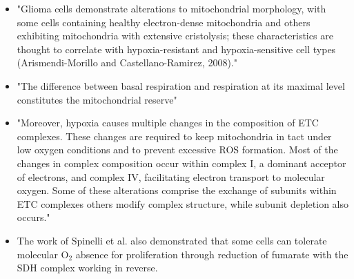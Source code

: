 \documentclass[11pt,a4paper]{article}
\begin{document}
\begin{itemize}
\item "Glioma cells demonstrate alterations to mitochondrial morphology, with some cells containing healthy electron-dense mitochondria and others exhibiting mitochondria with extensive cristolysis; these characteristics are thought to correlate with hypoxia-resistant and hypoxia-sensitive cell types (Arismendi-Morillo and Castellano-Ramirez, 2008)."

\item "The difference between basal respiration and
respiration at its maximal level constitutes the mitochondrial reserve"\cite{Marchetti2020}

\item "Moreover, hypoxia causes multiple changes in the
composition of ETC complexes. These changes are required to keep mitochondria in tact under low oxygen conditions and to prevent excessive ROS formation. Most of the changes in complex composition occur within complex I, a dominant acceptor of electrons, and complex IV, facilitating electron transport to molecular oxygen. Some of these alterations comprise the exchange of subunits within ETC complexes others modify complex structure, while subunit depletion also occurs." \cite{Fuhrmann2017}

\item The work of Spinelli et al. also demonstrated that some cells can tolerate molecular O$_{2}$ absence for proliferation through reduction of fumarate with the SDH complex working in reverse. \cite{Spinelli2021}
\end{itemize}
\end{document}
